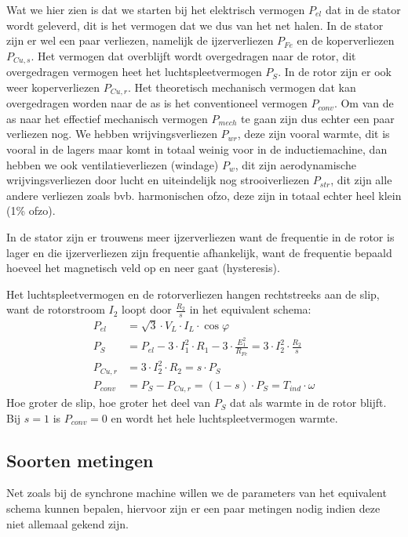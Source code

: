 Wat we hier zien is dat we starten bij het elektrisch vermogen $P_{el}$ dat in de stator
wordt geleverd, dit is het vermogen dat we dus van het net halen.
In de stator zijn er wel een paar verliezen, namelijk de ijzerverliezen $P_{Fe}$ en de
koperverliezen $P_{Cu,s}$.
Het vermogen dat overblijft wordt overgedragen naar de rotor, dit overgedragen vermogen
heet het luchtspleetvermogen $P_S$.
In de rotor zijn er ook weer koperverliezen $P_{Cu,r}$.
Het theoretisch mechanisch vermogen dat kan overgedragen worden naar de as is het
conventioneel vermogen $P_{conv}$.
Om van de as naar het effectief mechanisch vermogen $P_{mech}$ te gaan zijn dus echter een
paar verliezen nog.
We hebben wrijvingsverliezen $P_{wr}$, deze zijn vooral warmte, dit is vooral in de lagers
maar komt in totaal weinig voor in de inductiemachine, dan hebben we ook ventilatieverliezen
(windage) $P_w$, dit zijn aerodynamische wrijvingsverliezen door lucht en uiteindelijk nog
strooiverliezen $P_{str}$, dit zijn alle andere verliezen zoals bvb.
harmonischen ofzo, deze zijn in totaal echter heel klein (1\% ofzo).

In de stator zijn er trouwens meer ijzerverliezen want de frequentie in de rotor is lager
en die ijzerverliezen zijn frequentie afhankelijk, want de frequentie bepaald hoeveel het
magnetisch veld op en neer gaat (hysteresis).

Het luchtspleetvermogen en de rotorverliezen hangen rechtstreeks aan de slip, want de
rotorstroom $I_2$ loopt door $\frac{R_2}{s}$ in het equivalent schema:
\begin{align*}
    P_{el} &= \sqrt{3} \cdot V_L \cdot I_L \cdot \cos\varphi \\
    P_S &= P_{el} - 3 \cdot I_1^2 \cdot R_1 - 3 \cdot \frac{E_1^2}{R_{Fe}} = 3 \cdot I_2^2 \cdot \frac{R_2}{s} \\
    P_{Cu,r} &= 3 \cdot I_2^2 \cdot R_2 = s \cdot P_S \\
    P_{conv} &= P_S - P_{Cu,r} = (1-s) \cdot P_S = T_{ind} \cdot \omega
\end{align*}
Hoe groter de slip, hoe groter het deel van $P_S$ dat als warmte in de rotor blijft. Bij
$s = 1$ is $P_{conv} = 0$ en wordt het hele luchtspleetvermogen warmte.

\subsection{Soorten metingen}
Net zoals bij de synchrone machine willen we de parameters van het equivalent schema
kunnen bepalen, hiervoor zijn er een paar metingen nodig indien deze niet allemaal gekend
zijn.

